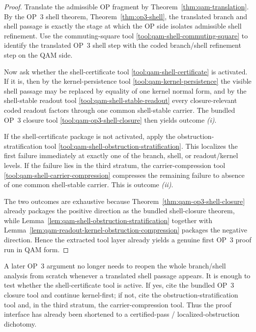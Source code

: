 \begin{proof}
Translate the admissible OP fragment by Theorem~\ref{thm:qam-translation}. By the OP~3 shell theorem, Theorem~\ref{thm:op3-shell}, the translated branch and shell passage is exactly the stage at which the OP side isolates admissible shell refinement. Use the commuting-square tool \ref{tool:qam-shell-commuting-square} to identify the translated OP~3 shell step with the coded branch/shell refinement step on the QAM side.

Now ask whether the shell-certificate tool \ref{tool:qam-shell-certificate} is activated. If it is, then by the kernel-persistence tool \ref{tool:qam-kernel-persistence} the visible shell passage may be replaced by equality of one kernel normal form, and by the shell-stable readout tool \ref{tool:qam-shell-stable-readout} every closure-relevant coded readout factors through one common shell-stable carrier. The bundled OP~3 closure tool \ref{tool:qam-op3-shell-closure} then yields outcome \emph{(i)}.

If the shell-certificate package is not activated, apply the obstruction-stratification tool \ref{tool:qam-shell-obstruction-stratification}. This localizes the first failure immediately at exactly one of the branch, shell, or readout/kernel levels. If the failure lies in the third stratum, the carrier-compression tool \ref{tool:qam-shell-carrier-compression} compresses the remaining failure to absence of one common shell-stable carrier. This is outcome \emph{(ii)}.

The two outcomes are exhaustive because Theorem~\ref{thm:qam-op3-shell-closure} already packages the positive direction as the bundled shell-closure theorem, while Lemma~\ref{lem:qam-shell-obstruction-stratification} together with Lemma~\ref{lem:qam-readout-kernel-obstruction-compression} packages the negative direction. Hence the extracted tool layer already yields a genuine first OP~3 proof run in QAM form.
\end{proof}

\begin{corollary}\label{cor:qam-op3-proof-run-use}
A later OP~3 argument no longer needs to reopen the whole branch/shell analysis from scratch whenever a translated shell passage appears. It is enough to test whether the shell-certificate tool is active. If yes, cite the bundled OP~3 closure tool and continue kernel-first; if not, cite the obstruction-stratification tool and, in the third stratum, the carrier-compression tool. Thus the proof interface has already been shortened to a certified-pass / localized-obstruction dichotomy.
\end{corollary}

